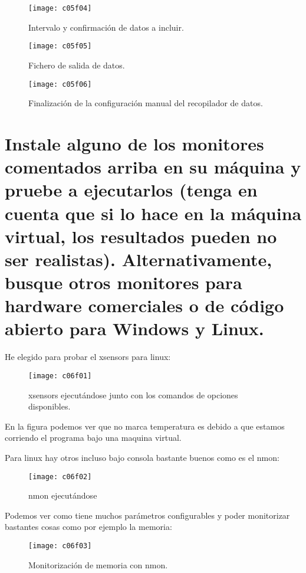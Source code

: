 \begin{figure}[H]
	\centering
	\texttt{[image: c05f04]}
	\caption{Intervalo y confirmación de datos a incluir.}
	\label{fig:c05f04}
\end{figure}
\begin{figure}[H]
	\centering
	\texttt{[image: c05f05]}
	\caption{Fichero de salida de datos.}
	\label{fig:c05f05}
\end{figure}
\begin{figure}[H]
	\centering
	\texttt{[image: c05f06]}
	\caption{Finalización de la configuración manual del recopilador de datos.}
	\label{fig:c05f06}
\end{figure}




\section{Instale alguno de los monitores comentados arriba en su máquina y pruebe a ejecutarlos (tenga en cuenta que si lo hace en la máquina virtual, los resultados pueden no ser realistas). Alternativamente,	busque otros monitores para hardware comerciales o de código abierto para Windows y Linux.}

He elegido para probar el xsensors para linux:

\begin{figure}[H]
	\centering
	\texttt{[image: c06f01]}
	\caption{xsensors ejecutándose junto con los comandos de opciones disponibles.}
	\label{fig:c06f01}
\end{figure}

En la figura podemos ver que no marca temperatura es debido a que estamos corriendo el programa bajo una maquina virtual.

Para linux hay otros incluso bajo consola bastante buenos como es el nmon:
\begin{figure}[H]
	\centering
	\texttt{[image: c06f02]}
	\caption{nmon ejecutándose}
	\label{fig:c06f02}
\end{figure}

Podemos ver como tiene muchos parámetros configurables y poder monitorizar bastantes cosas como por ejemplo la memoria:
\begin{figure}[H]
	\centering
	\texttt{[image: c06f03]}
	\caption{Monitorización de memoria con nmon.}
	\label{fig:c06f03}
\end{figure}

